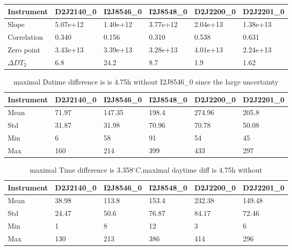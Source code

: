 \documentclass  [
  paper    = a4,
  BCOR     = 10mm,
  twoside,
  fontsize = 12pt,
  fleqn,
  toc      = bibnumbered,
  toc      = listofnumbered,
  numbers  = noendperiod,
  headings = normal,
  listof   = leveldown,
  version  = 3.03
]                                       {scrreprt}
\begin{document}
	\begin{table}[h]
		\begin{tabular}{|p{2cm}|p{2cm}|p{2cm}|p{2cm}|p{2cm}|p{2cm}|}
			Instrument	&D2J2140\_0&I2J8546\_0& I2J8548\_0&D2J2200\_0&D2J2201\_0\\
			\toprule
			Slope&5.07e+12&1.40e+12 &3.77e+12 &2.04e+13& 1.38e+13\\
			\midrule
			Correlation&
			0.340&
			0.156&
			0.310&
			0.538&
			0.631\\
			\midrule
			Zero point& 3.43e+13&3.39e+13&3.28e+13&  4.01e+13&  2.24e+13\\
			\midrule
			$\Delta DT_{2}$&6.8&24.2&8.7&1.9&1.62\\
			\bottomrule
		\end{tabular}
		\label{tab:dtcalc}
	\end{table}
	\begin{table}
	\begin{tabular}{|p{2cm}|p{2cm}|p{2cm}|p{2cm}|p{2cm}|p{2cm}|}
		Instrument	&D2J2140\_0&I2J8546\_0& I2J8548\_0&D2J2200\_0&D2J2201\_0\\
		\toprule
		Mean&71.97&147.35&198.4&274.96&205.8\\
		\midrule
		Std&
		31.87&
		31.98&
		70.96&
		70.78&
		50.08\\
		\midrule
		Min&6&58&91&54 &45\\
		\midrule
		Max&160&214&399&433 &297\\
		\bottomrule
	\end{tabular}
	\caption{maximal Datime difference is  is 4.75h without I2J8546\_0 since the large uncertainty}
	\label{tab:daytimerest}
\end{table}	


	\begin{table}
	\begin{tabular}{|p{2cm}|p{2cm}|p{2cm}|p{2cm}|p{2cm}|p{2cm}|}
		Instrument	&D2J2140\_0&I2J8546\_0& I2J8548\_0&D2J2200\_0&D2J2201\_0\\
		\toprule
		Mean&38.98&113.8&153.4&232.38&149.48\\
		\midrule
		Std&
		24.47&
		50.6&
		76.87&
		84.17&
		72.46\\
		\midrule
		Min&1&8&12&3 &6\\
		\midrule
		Max&130&213&386&414 &296\\
		\bottomrule
	\end{tabular}
	\caption{maximal Time difference is 3.358$^{\circ}C$,maximal daytime diff is 4.75h without}
\end{table}	
\end{document}
